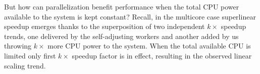 But how can parallelization benefit performance when the total CPU power available to the system is kept constant? Recall, in the multicore case superlinear speedup emerges thanks to the superposition of two independent $k\times$ speedup trends, one delivered by the self-adjusting workers and another added by us throwing $k\times$ more CPU power to the system. When the total available CPU is limited only first $k\times$ speedup factor is in effect, resulting in the observed linear scaling trend.


%





